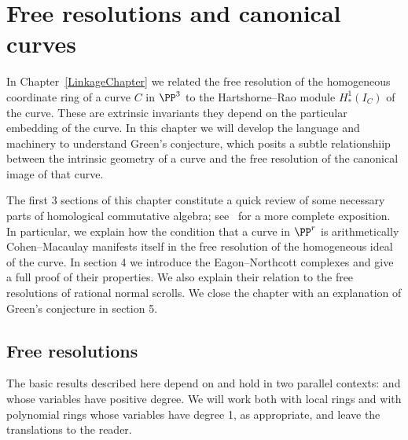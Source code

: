 

\chapter{Free resolutions and canonical curves}
\label{SyzygiesChapter}

\def\length{\mathrm{ length}}

In Chapter~\ref{LinkageChapter} we related the free resolution of the homogeneous
coordinate ring of a curve $C$
in $\PP^3$ to the Hartshorne--Rao module $H^{1}_{*}(I_{C})$ of the curve. These 
are extrinsic invariants \emdash they depend on the particular embedding of the curve.
 In this chapter we will develop the
language and machinery to understand Green's conjecture, which posits a
subtle relationshiip between the intrinsic geometry of a curve and the free resolution
of the canonical image of that curve.

The first 3 sections of this
chapter constitute a quick review of some necessary parts of
 homological commutative algebra; see~\cite[Part III]{Eisenbud1995}
 for a more complete exposition. In particular, we
  explain how the condition that a curve
in $\PP^r$ is arithmetically Cohen--Macaulay manifests itself in the
free resolution of the homogeneous ideal of the curve. In section 4 we
introduce the Eagon--Northcott complexes and give a full proof of their
properties. We also explain their relation to
the free resolutions of rational normal scrolls. We close the chapter with an
explanation of Green's conjecture in section 5.

\section{Free resolutions}


The basic results described here depend on 
 and hold 
%
 in two parallel contexts:
%
%
and
%
%
whose variables have positive degree. 
We will work both with local rings and with
polynomial rings whose variables have degree 1,
as appropriate, and leave the translations to the reader.



